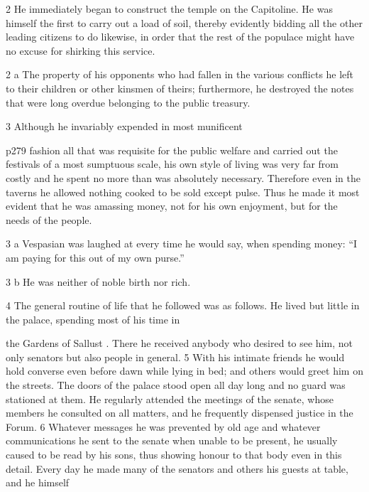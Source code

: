 2
He immediately began to construct the temple on the Capitoline. He was himself the first to carry out a load of soil, thereby evidently bidding all the other leading citizens to do likewise, in order that the rest of the populace might have no excuse for shirking this service.

2 a
The property of his opponents who had fallen in the various conflicts he left to their children or other kinsmen of theirs; furthermore, he destroyed the notes that were long overdue belonging to the public treasury.

3
Although he invariably expended in most munificent

p279 fashion all that was requisite for the public welfare and carried out the festivals of a most sumptuous scale, his own style of living was very far from costly and he spent no more than was absolutely necessary. Therefore even in the taverns he allowed nothing cooked to be sold except pulse. Thus he made it most evident that he was amassing money, not for his own enjoyment, but for the needs of the people.

3 a
Vespasian was laughed at every time he would say, when spending money: ``I am paying for this out of my own purse.''

3 b
He was neither of noble birth nor rich.

4
The general routine of life that he followed was as follows. He lived but little in the palace, spending most of his time in

the Gardens of Sallust . There he received anybody who desired to see him, not only senators but also people in general. 5 With his intimate friends he would hold converse even before dawn while lying in bed; and others would greet him on the streets. The doors of the palace stood open all day long and no guard was stationed at them. He regularly attended the meetings of the senate, whose members he consulted on all matters, and he frequently dispensed justice in the Forum. 6 Whatever messages he was prevented by old age and whatever communications he sent to the senate when unable to be present, he usually caused to be read by his sons, thus showing honour to that body even in this detail. Every day he made many of the senators and others his guests at table, and he himself

